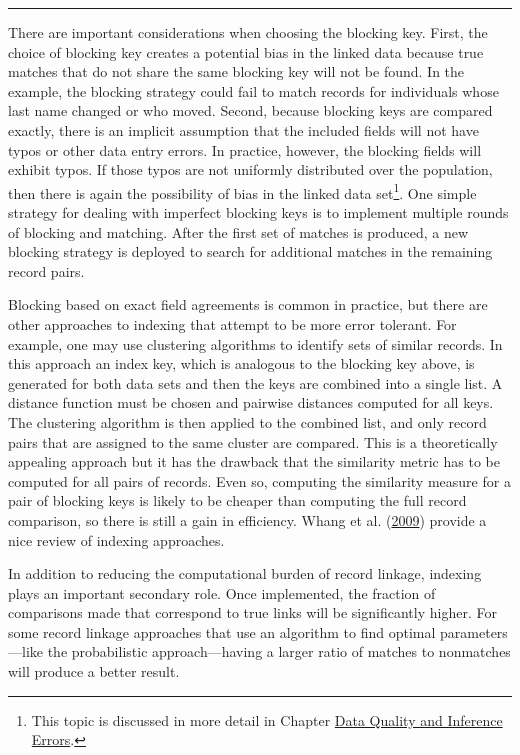 \documentclass[]{krantz}
\begin{document}
\begin{center}\rule{0.5\linewidth}{\linethickness}\end{center}

There are important considerations when choosing the blocking key.
First, the choice of blocking key creates a potential bias in the linked
data because true matches that do not share the same blocking key will
not be found. In the example, the blocking strategy could fail to match
records for individuals whose last name changed or who moved. Second,
because blocking keys are compared exactly, there is an implicit
assumption that the included fields will not have typos or other data
entry errors. In practice, however, the blocking fields will exhibit
typos. If those typos are not uniformly distributed over the population,
then there is again the possibility of bias in the linked data
set\footnote{This topic is discussed in more detail in Chapter
  \protect\hyperlink{chap:errors}{Data Quality and Inference Errors}.}.
One simple strategy for dealing with imperfect blocking keys is to
implement multiple rounds of blocking and matching. After the first set
of matches is produced, a new blocking strategy is deployed to search
for additional matches in the remaining record pairs.

Blocking based on exact field agreements is common in practice, but
there are other approaches to indexing that attempt to be more error
tolerant. For example, one may use clustering algorithms to identify
sets of similar records. In this approach an index key, which is
analogous to the blocking key above, is generated for both data sets and
then the keys are combined into a single list. A distance function must
be chosen and pairwise distances computed for all keys. The clustering
algorithm is then applied to the combined list, and only record pairs
that are assigned to the same cluster are compared. This is a
theoretically appealing approach but it has the drawback that the
similarity metric has to be computed for all pairs of records. Even so,
computing the similarity measure for a pair of blocking keys is likely
to be cheaper than computing the full record comparison, so there is
still a gain in efficiency. Whang et al.
(\protect\hyperlink{ref-whang2009entity}{2009}) provide a nice review of
indexing approaches.

In addition to reducing the computational burden of record linkage,
indexing plays an important secondary role. Once implemented, the
fraction of comparisons made that correspond to true links will be
significantly higher. For some record linkage approaches that use an
algorithm to find optimal parameters---like the probabilistic
approach---having a larger ratio of matches to nonmatches will produce a
better result.
\end{document}
